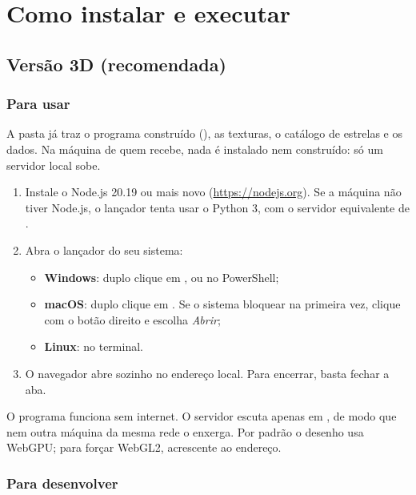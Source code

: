 \chapter{Como instalar e executar}\label{ap:execucao}

\section{Versão 3D (recomendada)}

\subsection{Para usar}

A pasta  já traz o programa construído (), as texturas, o catálogo de estrelas e os dados. Na máquina de quem recebe, nada é instalado nem construído: só um servidor local sobe.

\begin{enumerate}
  \item Instale o Node.js 20.19 ou mais novo (\url{https://nodejs.org}). Se a máquina não tiver Node.js, o lançador tenta usar o Python 3, com o servidor equivalente de .
  \item Abra o lançador do seu sistema:
  \begin{itemize}
    \item \textbf{Windows}: duplo clique em , ou  no PowerShell;
    \item \textbf{macOS}: duplo clique em . Se o sistema bloquear na primeira vez, clique com o botão direito e escolha \emph{Abrir};
    \item \textbf{Linux}:  no terminal.
  \end{itemize}
  \item O navegador abre sozinho no endereço local. Para encerrar, basta fechar a aba.
\end{enumerate}

O programa funciona sem internet. O servidor escuta apenas em , de modo que nem outra máquina da mesma rede o enxerga. Por padrão o desenho usa WebGPU; para forçar WebGL2, acrescente  ao endereço.

\subsection{Para desenvolver}

